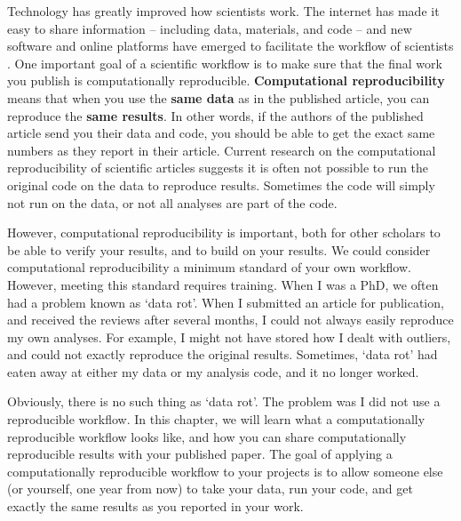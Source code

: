 \documentclass[
  oneside]{krantz}
\begin{document}
Technology has greatly improved how scientists work. The internet has made it
easy to share information -- including data, materials, and code -- and new
software and online platforms have emerged to facilitate the workflow of
scientists \citep{spellman_short_2015}. One important goal of a scientific workflow is to make sure that the
final work you publish is computationally reproducible. \textbf{Computational
reproducibility} means that when you use the \textbf{same data} as in the published
article, you can reproduce the \textbf{same results}. In other words, if the authors
of the published article send you their data and code, you should be able to get
the exact same numbers as they report in their article. Current research on the
computational reproducibility of scientific articles suggests it is often not
possible to run the original code on the data to reproduce results. Sometimes
the code will simply not run on the data, or not all analyses are part of the
code.

However, computational reproducibility is important, both for other scholars to
be able to verify your results, and to build on your results. We could consider
computational reproducibility a minimum standard of your own workflow. However,
meeting this standard requires training. When I was a PhD, we often had a
problem known as `data rot'. When I submitted an article for publication, and
received the reviews after several months, I could not always easily reproduce
my own analyses. For example, I might not have stored how I dealt with outliers,
and could not exactly reproduce the original results. Sometimes, `data rot' had
eaten away at either my data or my analysis code, and it no longer worked.

Obviously, there is no such thing as `data rot'. The problem was I did not use a
reproducible workflow. In this chapter, we will learn what a computationally
reproducible workflow looks like, and how you can share computationally
reproducible results with your published paper. The goal of applying a
computationally reproducible workflow to your projects is to allow
someone else (or yourself, one year from now) to take your data, run your code,
and get exactly the same results as you reported in your work.
\end{document}
